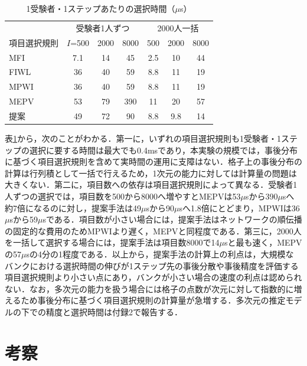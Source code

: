 \documentclass[a4paper,12pt,oneside,openany]{jsbook}
\begin{document}
\begin{table}[t]
\centering
\caption{1受験者・1ステップあたりの選択時間（$\mu$s）}
\label{tab:cost}
\footnotesize
\begin{tabular}{lcccccc}
\hline
 & \multicolumn{3}{c}{受験者1人ずつ} & \multicolumn{3}{c}{2000人一括}\\
項目選択規則 & $I$=500 & 2000 & 8000 & 500 & 2000 & 8000\\
\hline
MFI & 7.1 & 14 & 45 & 2.5 & 10 & 44\\
FIWL & 36 & 40 & 59 & 8.8 & 11 & 19\\
MPWI & 36 & 40 & 59 & 8.8 & 11 & 19\\
MEPV & 53 & 79 & 390 & 11 & 20 & 57\\
提案 & 49 & 72 & 90 & 8.8 & 9.8 & 14\\
\hline
\end{tabular}
\end{table}

表\ref{tab:cost}から，次のことがわかる．第一に，いずれの項目選択規則も1受験者・1ステップの選択に要する時間は最大でも0.4msであり，本実験の規模では，事後分布に基づく項目選択規則を含めて実時間の運用に支障はない．格子上の事後分布の計算は行列積として一括で行えるため，1次元の能力に対しては計算量の問題は大きくない．第二に，項目数への依存は項目選択規則によって異なる．受験者1人ずつの選択では，項目数を500から8000へ増やすとMEPVは53$\mu$sから390$\mu$sへ約7倍になるのに対し，提案手法は49$\mu$sから90$\mu$sへ1.8倍にとどまり，MPWIは36$\mu$sから59$\mu$sである．項目数が小さい場合には，提案手法はネットワークの順伝播の固定的な費用のためMPWIより遅く，MEPVと同程度である．第三に，2000人を一括して選択する場合には，提案手法は項目数8000で14$\mu$sと最も速く，MEPVの57$\mu$sの4分の1程度である．以上から，提案手法の計算上の利点は，大規模なバンクにおける選択時間の伸びが1ステップ先の事後分散や事後精度を評価する項目選択規則より小さい点にあり，バンクが小さい場合の速度の利点は認められない．なお，多次元の能力を扱う場合には格子の点数が次元に対して指数的に増えるため事後分布に基づく項目選択規則の計算量が急増する．多次元の推定モデルの下での精度と選択時間は付録2で報告する．

\section{考察}\label{sec:discussion}
\end{document}
